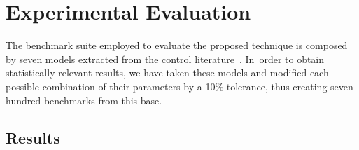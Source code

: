 \documentclass[sigconf]{llncs}
\renewcommand{\note}[1]{\textcolor{red}{[#1]}}
\begin{document}
\section{Experimental Evaluation}
\label{exp:evaluation}

The benchmark suite employed to evaluate the proposed technique is composed
by seven models extracted from the control literature~\cite{acrobot, cstr,
CHEN1979389, KOKOTOVIC198023, gajic2008optimal, Franklin15, maglev,
converters}.  In~order to obtain statistically relevant results, we have
taken these models and modified each possible combination of their
parameters by a 10\% tolerance, thus creating seven hundred benchmarks from
this base.



\subsection{Results}
\label{exp:results}
\end{document}
